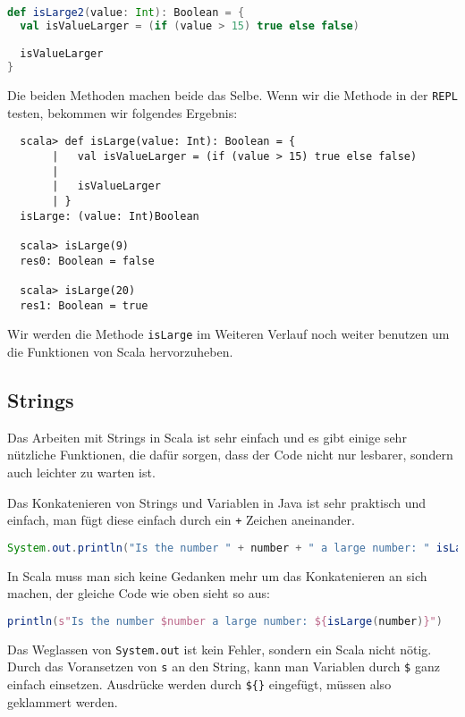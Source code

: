 \begin{lstlisting}[language=Scala]
def isLarge2(value: Int): Boolean = {
  val isValueLarger = (if (value > 15) true else false)

  isValueLarger
}
\end{lstlisting}

Die beiden Methoden machen beide das Selbe. Wenn wir die Methode in der \texttt{REPL} testen, bekommen wir folgendes Ergebnis:

\begin{verbatim}
  scala> def isLarge(value: Int): Boolean = {
       |   val isValueLarger = (if (value > 15) true else false)
       |
       |   isValueLarger
       | }
  isLarge: (value: Int)Boolean

  scala> isLarge(9)
  res0: Boolean = false

  scala> isLarge(20)
  res1: Boolean = true
\end{verbatim}

Wir werden die Methode \texttt{isLarge} im Weiteren Verlauf noch weiter benutzen um die Funktionen von Scala hervorzuheben.

\subsection{Strings}

Das Arbeiten mit Strings in Scala ist sehr einfach und es gibt einige sehr nützliche Funktionen, die dafür sorgen, dass der Code nicht nur lesbarer, sondern auch leichter zu warten ist.

Das Konkatenieren von Strings und Variablen in Java ist sehr praktisch und einfach, man fügt diese einfach durch ein \texttt{+} Zeichen aneinander.

\begin{lstlisting}[language=Java,numbers=none]
System.out.println("Is the number " + number + " a large number: " isLarge(number));
\end{lstlisting}

In Scala muss man sich keine Gedanken mehr um das Konkatenieren an sich machen, der gleiche Code wie oben sieht so aus:

\begin{lstlisting}[language=Scala,numbers=none]
println(s"Is the number $number a large number: ${isLarge(number)}")
\end{lstlisting}

Das Weglassen von \texttt{System.out} ist kein Fehler, sondern ein Scala nicht nötig. Durch das Voransetzen von \texttt{s} an den String, kann man Variablen durch \texttt{\$} ganz einfach einsetzen. Ausdrücke werden durch \texttt{\$\{\}} eingefügt, müssen also geklammert werden.

